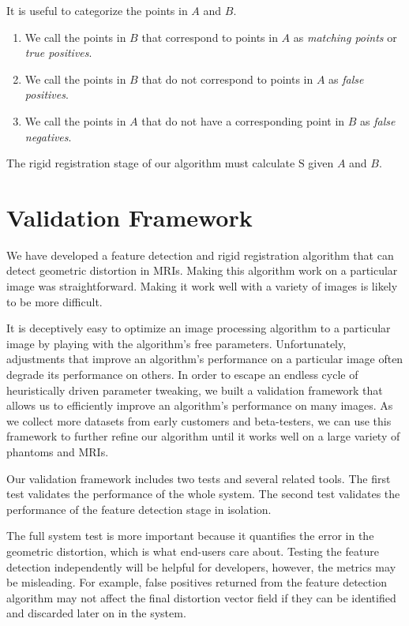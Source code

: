 \documentclass[12pt]{article}
\begin{document}
It is useful to categorize the points in $A$ and $B$.

\begin{enumerate}
    \item We call the points in $B$ that correspond to points in $A$ as \textit{matching points} or \textit{true positives}.
    \item We call the points in $B$ that do not correspond to points in $A$ as \textit{false positives}.
    \item We call the points in $A$ that do not have a corresponding point in $B$ as \textit{false negatives}.
\end{enumerate}

The rigid registration stage of our algorithm must calculate $\textrm{S}$ given $A$ and $B$.

\section{Validation Framework}

We have developed a feature detection and rigid registration algorithm that can detect geometric distortion in MRIs.  Making this algorithm work on a particular image was straightforward.  Making it work well with a variety of images is likely to be more difficult.

It is deceptively easy to optimize an image processing algorithm to a particular image by playing with the algorithm's free parameters. Unfortunately, adjustments that improve an algorithm's performance on a particular image often degrade its performance on others.  In order to escape an endless cycle of heuristically driven parameter tweaking, we built a validation framework that allows us to efficiently improve an algorithm's performance on many images.  As we collect more datasets from early customers and beta-testers, we can use this framework to further refine our algorithm until it works well on a large variety of phantoms and MRIs.

Our validation framework includes two tests and several related tools.  The first test validates the performance of the whole system.  The second test validates the performance of the feature detection stage in isolation.

The full system test is more important because it quantifies the error in the geometric distortion, which is what end-users care about.  Testing the feature detection independently will be helpful for developers, however, the metrics may be misleading.  For example, false positives returned from the feature detection algorithm may not affect the final distortion vector field if they can be identified and discarded later on in the system.
\end{document}
